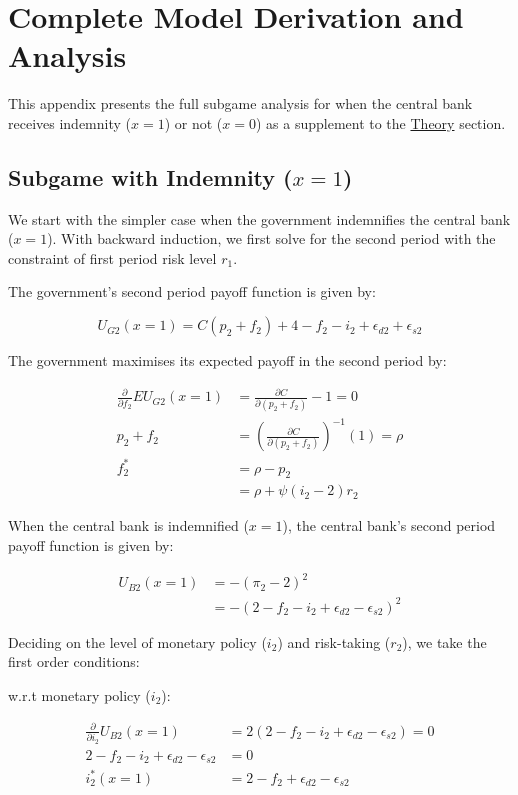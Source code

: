 \documentclass[
  a4paper,
  abstract=true]{scrartcl}
\theoremstyle{definition}
\begin{document}
\section{Complete Model Derivation and Analysis}\label{sec-model-app}

This appendix presents the full subgame analysis for when the central
bank receives indemnity (\(x=1\)) or not (\(x=0\)) as a supplement to
the \hyperref[sec-theory]{Theory} section.

\subsection{\texorpdfstring{Subgame with Indemnity
(\(x=1\))}{Subgame with Indemnity (x=1)}}\label{sec-model-app-indem}

We start with the simpler case when the government indemnifies the
central bank (\(x=1\)). With backward induction, we first solve for the
second period with the constraint of first period risk level \(r_1\).

The government's second period payoff function is given by:

\[
U_{G2}(x=1)= C(p_2+f_2) + 4 -f_2-i_2 +\epsilon_{d2}+\epsilon_{s2}
\]

The government maximises its expected payoff in the second period by:

\begin{align*}
\frac{\partial}{\partial f_2} EU_{G2}(x=1) &= \frac{\partial C}{\partial (p_2 + f_2)} -1=0 \\
p_2+f_2 &= \left( \frac{\partial C}{\partial (p_2 + f_2)} \right)^{-1}(1)=\rho \\
f_2^*&= \rho -p_2 \\
&=\rho +\psi(i_2-2)r_2
\end{align*}

When the central bank is indemnified (\(x=1\)), the central bank's
second period payoff function is given by:

\begin{align*}
U_{B2}(x=1) &=-(\pi_2-2)^2 \\
&=-(2-f_2-i_2+\epsilon_{d2}-\epsilon_{s2})^2
\end{align*}

Deciding on the level of monetary policy (\(i_2\)) and risk-taking
(\(r_2\)), we take the first order conditions:

w.r.t monetary policy (\(i_2\)):

\begin{align}
\frac{\partial}{\partial i_2} U_{B2}(x=1) &= 2(2-f_2-i_2+\epsilon_{d2}-\epsilon_{s2})=0 \nonumber \\
2-f_2-i_2+\epsilon_{d2}-\epsilon_{s2}&=0 \label{eq-inftarget} \\
i_2^*(x=1) &= 2-f_2+\epsilon_{d2}-\epsilon_{s2} \nonumber
\end{align}
\end{document}
